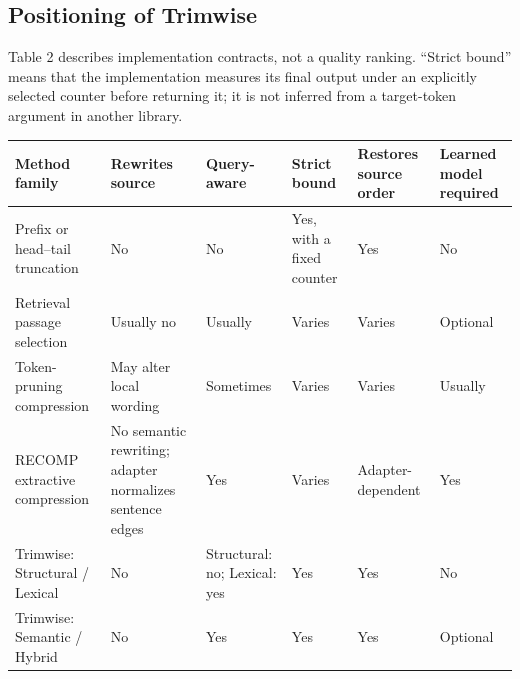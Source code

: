 \documentclass[
]{article}
\newcounter{none} %
\begin{document}
\subsection{Positioning of Trimwise}\label{positioning-of-trimwise}

Table 2 describes implementation contracts, not a quality ranking.
``Strict bound'' means that the implementation measures its final output
under an explicitly selected counter before returning it; it is not
inferred from a target-token argument in another library.

{\def\LTcaptype{none} %
\begin{longtable}[]{@{}
  >{\raggedright\arraybackslash}p{}
  >{\raggedleft\arraybackslash}p{}
  >{\raggedleft\arraybackslash}p{}
  >{\raggedleft\arraybackslash}p{}
  >{\raggedleft\arraybackslash}p{}
  >{\raggedleft\arraybackslash}p{}@{}}
\toprule\noalign{}
\begin{minipage}[b]{\linewidth}\raggedright
Method family
\end{minipage} & \begin{minipage}[b]{\linewidth}\raggedleft
Rewrites source
\end{minipage} & \begin{minipage}[b]{\linewidth}\raggedleft
Query-aware
\end{minipage} & \begin{minipage}[b]{\linewidth}\raggedleft
Strict bound
\end{minipage} & \begin{minipage}[b]{\linewidth}\raggedleft
Restores source order
\end{minipage} & \begin{minipage}[b]{\linewidth}\raggedleft
Learned model required
\end{minipage} \\
\midrule\noalign{}
\endhead
\bottomrule\noalign{}
\endlastfoot
Prefix or head--tail truncation & No & No & Yes, with a fixed counter &
Yes & No \\
Retrieval passage selection & Usually no & Usually &
Varies & Varies & Optional \\
Token-pruning compression & May alter local wording & Sometimes &
Varies & Varies & Usually \\
RECOMP extractive compression & No semantic rewriting; adapter
normalizes sentence edges & Yes & Varies &
Adapter-dependent & Yes \\
Trimwise: Structural / Lexical & No & Structural: no; Lexical: yes & Yes
& Yes & No \\
Trimwise: Semantic / Hybrid & No & Yes & Yes & Yes & Optional \\
\end{longtable}
}
\end{document}
